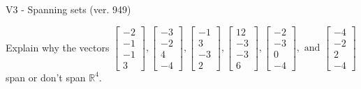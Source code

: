 \begin{exercise}
  \begin{exerciseTitle}V3 - Spanning sets (ver. 949)\end{exerciseTitle}
  \begin{exerciseStatement}
    Explain why the vectors \(\left[\begin{array}{r}
-2 \\
-1 \\
-1 \\
3
\end{array}\right] , \left[\begin{array}{r}
-3 \\
-2 \\
4 \\
-4
\end{array}\right] , \left[\begin{array}{r}
-1 \\
3 \\
-3 \\
2
\end{array}\right] , \left[\begin{array}{r}
12 \\
-3 \\
-3 \\
6
\end{array}\right] , \left[\begin{array}{r}
-2 \\
-3 \\
0 \\
-4
\end{array}\right] , \text{ and } \left[\begin{array}{r}
-4 \\
-2 \\
2 \\
-4
\end{array}\right]\) span or don't span \(\mathbb{R}^4\). 
	



\end{exerciseStatement}
\end{exercise}
